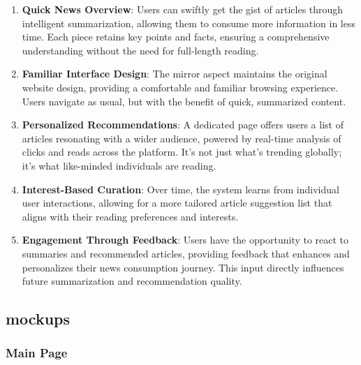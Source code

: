 \documentclass[a4paper]{article}
\begin{document}
\begin{enumerate}[wide, labelwidth=!, labelindent=0pt, label=\textbf{\arabic*.}]
    \item \textbf{Quick News Overview}: 
    Users can swiftly get the gist of articles through intelligent summarization, allowing them to consume more information in less time. Each piece retains key points and facts, ensuring a comprehensive understanding without the need for full-length reading.

    \item \textbf{Familiar Interface Design}: 
    The mirror aspect maintains the original website design, providing a comfortable and familiar browsing experience. Users navigate as usual, but with the benefit of quick, summarized content.

    \item \textbf{Personalized Recommendations}: 
    A dedicated page offers users a list of articles resonating with a wider audience, powered by real-time analysis of clicks and reads across the platform. It’s not just what’s trending globally; it’s what like-minded individuals are reading.

    \item \textbf{Interest-Based Curation}:
    Over time, the system learns from individual user interactions, allowing for a more tailored article suggestion list that aligns with their reading preferences and interests.

    \item \textbf{Engagement Through Feedback}:
    Users have the opportunity to react to summaries and recommended articles, providing feedback that enhances and personalizes their news consumption journey. This input directly influences future summarization and recommendation quality.
\end{enumerate}

\subsection{mockups}

\subsubsection{Main Page}
\end{document}
